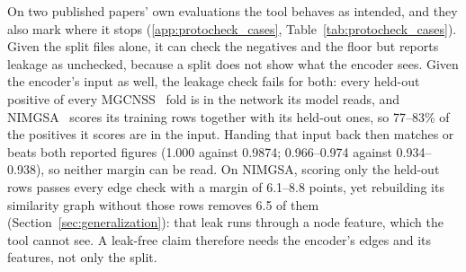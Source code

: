 \documentclass[review]{elsarticle}
\begin{document}
On two published papers' own evaluations the tool behaves as intended, and they also mark where it stops
(\ref{app:protocheck_cases}, Table~\ref{tab:protocheck_cases}). Given the split files alone, it
can check the negatives and the floor but reports leakage as unchecked, because a split does not show what
the encoder sees. Given the encoder's input as well, the leakage check fails for both: every held-out
positive of every MGCNSS~\cite{tian2024mgcnss} fold is in the network its model reads, and
NIMGSA~\cite{jin2022nimgsa} scores its training rows together with its held-out ones, so 77--83\% of the
positives it scores are in the input. Handing that input back then matches or beats both reported figures
(1.000 against 0.9874; 0.966--0.974 against 0.934--0.938), so neither margin can be read. On NIMGSA,
scoring only the held-out rows passes every edge check with a margin of 6.1--8.8 points, yet rebuilding its
similarity graph without those rows removes 6.5 of them (Section~\ref{sec:generalization}): that leak runs
through a node feature, which the tool cannot see. A leak-free claim therefore needs the encoder's edges
and its features, not only the split.
\end{document}
